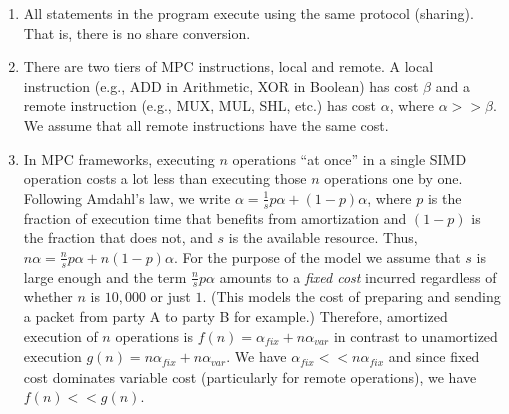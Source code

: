 \begin{enumerate}
\item All statements in the program execute using the same protocol (sharing). That is, there is no share conversion.
\item There are two tiers of MPC instructions, local and remote. A local instruction (e.g., ADD in Arithmetic, XOR in Boolean) 
has cost $\beta$ and a remote instruction (e.g., MUX, MUL, SHL, etc.) has cost $\alpha$, where $\alpha >> \beta$. We assume that all remote
instructions have the same cost.
\item  In MPC frameworks, executing $n$ operations ``at once'' in a single SIMD operation costs a lot less than executing those $n$ operations one by one.
Following Amdahl's law, we write $\alpha = \frac{1}{s}p\alpha + (1-p)\alpha$, where $p$ is the fraction of execution time that benefits from amortization and $(1-p)$
is the fraction that does not, and $s$ is the available resource. Thus, $n\alpha = \frac{n}{s}p\alpha + n(1-p)\alpha$.
For the purpose of the model we assume that $s$ is large enough and the term $\frac{n}{s}p\alpha$ amounts to a \emph{fixed cost} incurred regardless of
whether $n$ is $10,000$ or just $1$. (This models the cost of preparing and sending a packet from party A to party B for example.) Therefore, amortized execution
of $n$ operations is $f(n) = \alpha_\mathit{fix} + n\alpha_{var}$ in contrast to unamortized execution $g(n) = n\alpha_\mathit{fix} + n\alpha_{var}$.
We have $\alpha_\mathit{fix} << n\alpha_\mathit{fix}$ and since fixed cost dominates variable cost (particularly for remote operations), we have $f(n) << g(n)$.

\end{enumerate}
